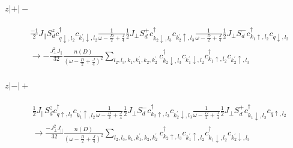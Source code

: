 \documentclass[12pt]{revtex4-2}
\begin{document}
\paragraph{\(z|+|-\)}
\begin{equation}\begin{aligned}
	&\frac{-1}{2}J_\parallel S_d^z c^\dagger_{q \downarrow, l_2}c_{k_1^\prime \downarrow, l_2}\frac{1}{\omega - \frac{D}{2} + \frac{J}{4}}\frac{1}{2}J_\perp S_d^+ c^\dagger_{k_2 \downarrow, l_3}c_{k_2^\prime \uparrow, l_3} \frac{1}{\omega - \frac{D}{2} + \frac{J}{4}} \frac{1}{2}J_\perp S_d^- c^\dagger_{k_1 \uparrow, l_2} c_{q \downarrow, l_2} \\
	&\longrightarrow -\frac{J_\perp^2 J_\parallel}{32} \frac{n(D)}{\left(\omega - \frac{D}{2} + \frac{J}{4}\right)^2}\sum_{l_2, l_3, k_1,k_1^\prime,k_2,k_2^\prime}c^\dagger_{k_2 \downarrow, l_3}c_{k_1^\prime \downarrow, l_2}c^\dagger_{k_1 \uparrow, l_2}c_{k_2^\prime \uparrow, l_3}
\end{aligned}\end{equation}

\paragraph{\(z|-|+\)}
\begin{equation}\begin{aligned}
	&\frac{1}{2}J_\parallel S_d^z c^\dagger_{q \uparrow, l_2}c_{k_1^\prime \uparrow, l_2}\frac{1}{\omega - \frac{D}{2} + \frac{J}{4}}\frac{1}{2}J_\perp S_d^- c^\dagger_{k_2 \uparrow, l_3}c_{k_2^\prime \downarrow, l_3} \frac{1}{\omega - \frac{D}{2} + \frac{J}{4}} \frac{1}{2}J_\perp S_d^+ c^\dagger_{k_1 \downarrow, l_2} c_{q \uparrow, l_2} \\
	&\longrightarrow \frac{-J_\perp^2 J_\parallel}{32} \frac{n(D)}{\left(\omega - \frac{D}{2} + \frac{J}{4}\right)^2}\sum_{l_2, l_3, k_1,k_1^\prime,k_2,k_2^\prime}c^\dagger_{k_2 \uparrow, l_3}c_{k_1^\prime \uparrow, l_2}c^\dagger_{k_1 \downarrow, l_2}c_{k_2^\prime \downarrow, l_3}
\end{aligned}\end{equation}
\end{document}
